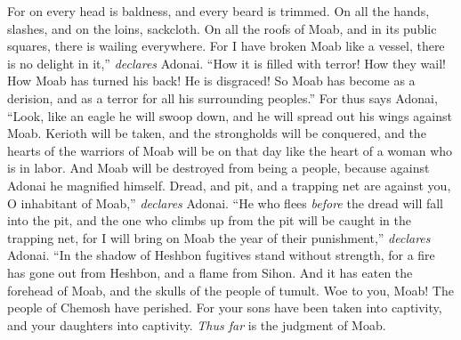 \begin{biblechapter}
\verse For on every head is baldness, 
and every beard is trimmed. 
On all the hands, slashes, 
and on the loins, sackcloth.
\verse On all the roofs of Moab, and in its public squares, 
there is wailing everywhere. 
For I have broken Moab like a vessel, 
there is no delight in it,” \textit{declares} Adonai.
\verse “How it is filled with terror! How they wail! 
How Moab has turned his back! He is disgraced! 
So Moab has become as a derision, 
and as a terror for all his surrounding peoples.”
\verse For thus says Adonai,
\verse “Look, like an eagle he will swoop down, 
and he will spread out his wings against Moab.
\verse Kerioth will be taken, 
and the strongholds will be conquered, 
and the hearts of the warriors of Moab will be on that day 
like the heart of a woman who is in labor.
\verse And Moab will be destroyed from being a people, 
because against Adonai he magnified himself.
\verse Dread, and pit, and a trapping net are against you, 
O inhabitant of Moab,” \textit{declares} Adonai.
\verse “He who flees \textit{before} the dread 
will fall into the pit, 
and the one who climbs up from the pit 
will be caught in the trapping net, 
for I will bring on Moab 
the year of their punishment,” \textit{declares} Adonai.
\verse “In the shadow of Heshbon 
fugitives stand without strength, 
for a fire has gone out from Heshbon, 
and a flame from Sihon. 
And it has eaten the forehead of Moab, 
and the skulls of the people of tumult.
\verse Woe to you, Moab! 
The people of Chemosh have perished. 
For your sons have been taken into captivity, 
and your daughters into captivity. \textit{Thus far} is the judgment of Moab.
\end{biblechapter}

